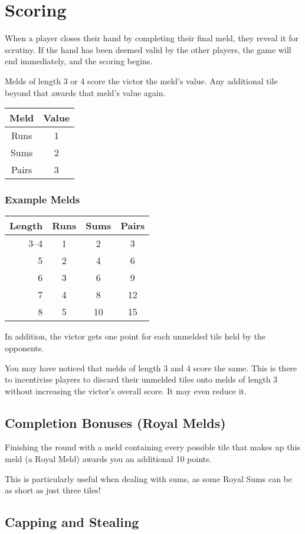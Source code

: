\section{Scoring}\label{sec:scoring}
When a player closes their hand by completing their final meld, they reveal it for scrutiny. 
If the hand has been deemed valid by the other players, the game will end immediately, and the scoring begins.

Melds of length 3 or 4 score the victor the meld's value. Any additional tile beyond that awards that meld's value again.

\begin{center}
    \begin{tabular}{c|c}
        Meld & Value\\\hline\hline
        Runs & 1\\
        Sums & 2\\
        Pairs & 3\\
    \end{tabular}
\end{center}

\subsubsection*{Example Melds}
\begin{center}
    \begin{tabular}{r|c|c|c}
        Length & Runs & Sums & Pairs\\\hline\hline
        3--4 & 1 &  2 &  3 \\
           5 & 2 &  4 &  6 \\
           6 & 3 &  6 &  9 \\
           7 & 4 &  8 & 12 \\
           8 & 5 & 10 & 15 \\
    \end{tabular}
\end{center}

In addition, the victor gets one point for each unmelded tile held by the opponents.

\aside You may have noticed that melds of length 3 and 4 score the same. This is there to incentivise players to discard their unmelded tiles onto melds of length 3 without increasing the victor's overall score. It may even reduce it.

\subsection{Completion Bonuses (Royal Melds)}
Finishing the round with a meld containing every possible tile that makes up this meld (a Royal Meld) awards you an additional 10 points.

This is particularly useful when dealing with sums, as some Royal Sums can be as short as just three tiles!

\subsection{Capping and Stealing}